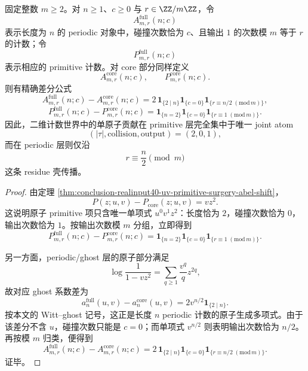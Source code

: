 \begin{theorem}\label{thm:conclusion-realinput40-uv-collision-output-delta-shell}
固定整数 \(m\ge 2\)。对 \(n\ge 1\)、\(c\ge 0\) 与 \(r\in\ZZ/m\ZZ\)，令
\[
A_{m,r}^{\mathrm{full}}(n;c)
\]
表示长度为 \(n\) 的 periodic 对象中，碰撞次数恰为 \(c\)、且输出 \(1\) 的次数模 \(m\) 等于 \(r\) 的计数；令
\[
P_{m,r}^{\mathrm{full}}(n;c)
\]
表示相应的 primitive 计数。对 core 部分同样定义
\[
A_{m,r}^{\mathrm{core}}(n;c),\qquad
P_{m,r}^{\mathrm{core}}(n;c).
\]
则有精确差分公式
\[
\boxed{\;
A_{m,r}^{\mathrm{full}}(n;c)-A_{m,r}^{\mathrm{core}}(n;c)
=
2\,\mathbf 1_{\{2\mid n\}}
\mathbf 1_{\{c=0\}}
\mathbf 1_{\{r\equiv n/2\;(\mathrm{mod}\,m)\}},\;}
\]
\[
\boxed{\;
P_{m,r}^{\mathrm{full}}(n;c)-P_{m,r}^{\mathrm{core}}(n;c)
=
\mathbf 1_{\{n=2\}}
\mathbf 1_{\{c=0\}}
\mathbf 1_{\{r\equiv 1\;(\mathrm{mod}\,m)\}}.\;}
\]
因此，二维计数世界中的单原子贡献在 primitive 层完全集中于唯一 joint atom
\[
(|\tau|,\mathrm{collision},\mathrm{output})=(2,0,1),
\]
而在 periodic 层则仅沿
\[
r\equiv \frac{n}{2}\pmod m
\]
这条 residue 壳传播。
\end{theorem}
\begin{proof}
由定理 \ref{thm:conclusion-realinput40-uv-primitive-surgery-abel-shift}，
\[
P(z;u,v)-P_{\mathrm{core}}(z;u,v)=vz^2.
\]
这说明原子 primitive 项只含唯一单项式 \(u^0v^1z^2\)：长度恰为 \(2\)，碰撞次数恰为 \(0\)，输出次数恰为 \(1\)。按输出次数模 \(m\) 分组，立即得到
\[
P_{m,r}^{\mathrm{full}}(n;c)-P_{m,r}^{\mathrm{core}}(n;c)
=
\mathbf 1_{\{n=2\}}
\mathbf 1_{\{c=0\}}
\mathbf 1_{\{r\equiv 1\;(\mathrm{mod}\,m)\}}.
\]

另一方面，periodic/ghost 层的原子部分满足
\[
\log\frac{1}{1-vz^2}
=
\sum_{q\ge 1}\frac{v^q}{q}z^{2q},
\]
故对应 ghost 系数差为
\[
a_n^{\mathrm{full}}(u,v)-a_n^{\mathrm{core}}(u,v)
=
2v^{n/2}\mathbf 1_{\{2\mid n\}}.
\]
按本文的 Witt--ghost 记号，这正是长度 \(n\) periodic 计数的原子生成多项式。由于该差分不含 \(u\)，碰撞次数只能是 \(c=0\)；而单项式 \(v^{n/2}\) 则表明输出次数恰为 \(n/2\)。再按模 \(m\) 归类，便得到
\[
A_{m,r}^{\mathrm{full}}(n;c)-A_{m,r}^{\mathrm{core}}(n;c)
=
2\,\mathbf 1_{\{2\mid n\}}
\mathbf 1_{\{c=0\}}
\mathbf 1_{\{r\equiv n/2\;(\mathrm{mod}\,m)\}}.
\]
证毕。
\end{proof}

